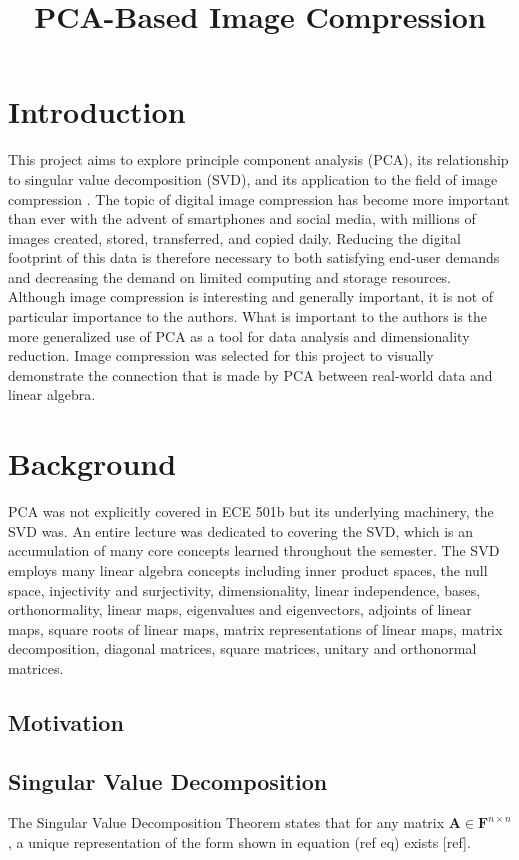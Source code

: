 \documentclass[conference]{IEEEtran}
\title{PCA-Based Image Compression}
\author{
\IEEEauthorblockN{Owen Sowatzke}
\IEEEauthorblockA{\textit{Electrical Engineering Department} \\
\textit{University of Arizona}\\
Tucson, USA \\
osowatzke@arizona.edu}
\and
\IEEEauthorblockN{Scott Thoesen}
\IEEEauthorblockA{\textit{Electrical Engineering Department} \\
\textit{University of Arizona}\\
Tucson, USA \\
thoesens@arizona.edu}}
\begin{document}
    \maketitle
		
    \section{Introduction}
    This project aims to explore principle component analysis (PCA), its relationship to singular value decomposition (SVD), and its application to the field of image compression \cite{jaradet_svd_image_compression}. The topic of digital image compression has become more important than ever with the advent of smartphones and social media, with millions of images created, stored, transferred, and copied daily. Reducing the digital footprint of this data is therefore necessary to both satisfying end-user demands and decreasing the demand on limited computing and storage resources. Although image compression is interesting and generally important, it is not of particular importance to the authors. What is important to the authors is the more generalized use of PCA as a tool for data analysis and dimensionality reduction. Image compression was selected for this project to visually demonstrate the connection that is made by PCA between real-world data and linear algebra.

    \section{Background}
    PCA was not explicitly covered in ECE 501b but its underlying machinery, the SVD was. An entire lecture was dedicated to covering the SVD, which is an accumulation of many core concepts learned throughout the semester. The SVD employs many linear algebra concepts including inner product spaces, the null space, injectivity and surjectivity, dimensionality, linear independence, bases, orthonormality, linear maps, eigenvalues and eigenvectors, adjoints of linear maps, square roots of linear maps, matrix representations of linear maps, matrix decomposition, diagonal matrices, square matrices, unitary and orthonormal matrices.

    \subsection{Motivation}


    \subsection{Singular Value Decomposition}
    The Singular Value Decomposition Theorem states that for any matrix $\mathbf{A} \in \mathbf{F}^{n \times n}$, a unique representation of the form shown in equation (ref eq) exists [ref].
\end{document}
